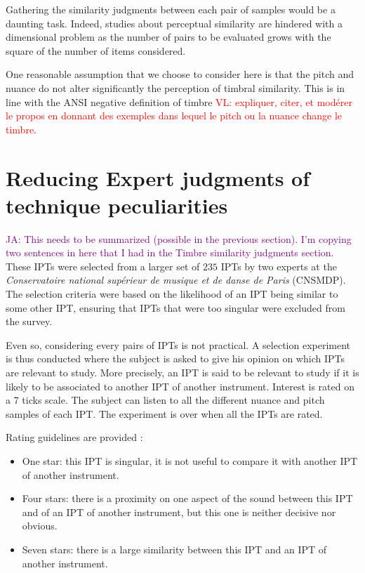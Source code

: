 \documentclass{bmcart}
\newcommand{\nmu}{}
\newcommand{\ipt}{IPT\xspace}
\newcommand{\ipts}{IPTs\xspace}
\newcommand{\vl}[1]{\textcolor{red}{VL: #1}\xspace}
\newcommand{\ja}[1]{\textcolor{purple}{JA: #1}\xspace}
\begin{document}
\begin{backmatter}
Gathering the similarity judgments between each pair of samples would be a daunting task. Indeed, studies about perceptual similarity are hindered with a dimensional problem as the number of pairs to be evaluated grows with the square of the number of items considered.

One reasonable assumption that we choose to consider here is that the pitch and nuance do not alter significantly the perception of timbral similarity. This is in line with the ANSI negative definition of timbre \vl{expliquer, citer, et modérer le propos en donnant des exemples dans lequel le pitch ou la nuance change le timbre}.


\section*{\nmu Reducing Expert judgments of technique peculiarities}

\ja{This needs to be summarized (possible in the previous section).
I'm copying two sentences in here that I had in the Timbre similarity judgments section.}%
These IPTs were selected from a larger set of $235$ IPTs by two experts at the \emph{Conservatoire national sup\'erieur de musique et de danse de Paris} (CNSMDP).
The selection criteria were based on the likelihood of an IPT being similar to some other IPT, ensuring that IPTs that were too singular were excluded from the survey.

Even so, considering every pairs of IPTs is not practical. A selection
experiment is thus conducted where the subject is asked to give his opinion on which
\ipts are relevant to study. More precisely, an \ipt is said to be relevant to study
if it is likely to be associated to another \ipt of another instrument.
Interest is rated on a 7 ticks scale. The subject can listen to all the different
nuance and pitch samples of each \ipt. The experiment is over when all the
\ipts are rated.

Rating guidelines are provided :
\begin{itemize}
  \item One star: this \ipt is singular, it is not useful to compare it with another \ipt of another instrument.
  \item Four stars: there is a proximity on one aspect of the sound between this
  \ipt and of an \ipt of another instrument,
  but this one is neither decisive nor obvious.
  \item Seven stars: there is a large similarity between this \ipt and an \ipt of another instrument.
\end{itemize}


\end{backmatter}
\end{document}
